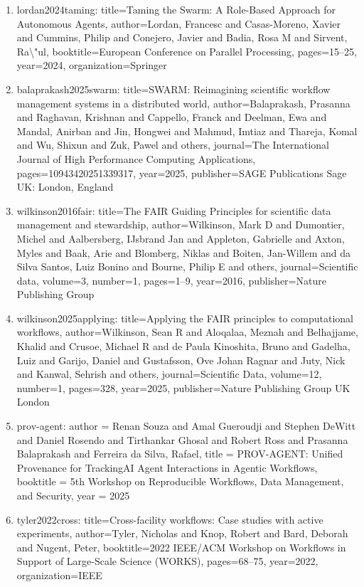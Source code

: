 \documentclass[11pt]{article}
\begin{document}
\begin{enumerate}[leftmargin=*]
  \item lordan2024taming: title=Taming the Swarm: A Role-Based Approach for Autonomous Agents, author=Lordan, Francesc and Casas-Moreno, Xavier and Cummins, Philip and Conejero, Javier and Badia, Rosa M and Sirvent, Ra\textbackslash{}"ul, booktitle=European Conference on Parallel Processing, pages=15--25, year=2024, organization=Springer
  \item balaprakash2025swarm: title=SWARM: Reimagining scientific workflow management systems in a distributed world, author=Balaprakash, Prasanna and Raghavan, Krishnan and Cappello, Franck and Deelman, Ewa and Mandal, Anirban and Jin, Hongwei and Mahmud, Imtiaz and Thareja, Komal and Wu, Shixun and Zuk, Pawel and others, journal=The International Journal of High Performance Computing Applications, pages=10943420251339317, year=2025, publisher=SAGE Publications Sage UK: London, England
  \item wilkinson2016fair: title=The FAIR Guiding Principles for scientific data management and stewardship, author=Wilkinson, Mark D and Dumontier, Michel and Aalbersberg, IJsbrand Jan and Appleton, Gabrielle and Axton, Myles and Baak, Arie and Blomberg, Niklas and Boiten, Jan-Willem and da Silva Santos, Luiz Bonino and Bourne, Philip E and others, journal=Scientific data, volume=3, number=1, pages=1--9, year=2016, publisher=Nature Publishing Group
  \item wilkinson2025applying: title=Applying the FAIR principles to computational workflows, author=Wilkinson, Sean R and Aloqalaa, Meznah and Belhajjame, Khalid and Crusoe, Michael R and de Paula Kinoshita, Bruno and Gadelha, Luiz and Garijo, Daniel and Gustafsson, Ove Johan Ragnar and Juty, Nick and Kanwal, Sehrish and others, journal=Scientific Data, volume=12, number=1, pages=328, year=2025, publisher=Nature Publishing Group UK London
  \item prov-agent: author = Renan Souza and Amal Gueroudji and Stephen DeWitt and Daniel Rosendo and Tirthankar Ghosal and Robert Ross and Prasanna Balaprakash and Ferreira da Silva, Rafael, title = PROV-AGENT: Unified Provenance for TrackingAI Agent Interactions in Agentic Workflows, booktitle = 5th Workshop on Reproducible Workflows, Data Management, and Security, year = 2025
  \item tyler2022cross: title=Cross-facility workflows: Case studies with active experiments, author=Tyler, Nicholas and Knop, Robert and Bard, Deborah and Nugent, Peter, booktitle=2022 IEEE/ACM Workshop on Workflows in Support of Large-Scale Science (WORKS), pages=68--75, year=2022, organization=IEEE

\end{enumerate}
\end{document}
